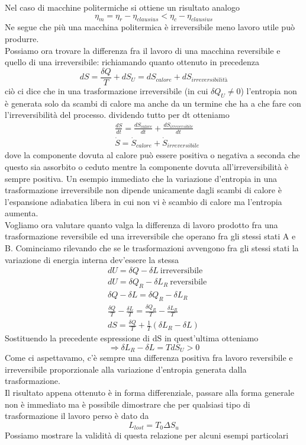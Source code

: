 \documentclass[10pt,a4paper]{article}
\begin{document}
Nel caso di macchine politermiche si ottiene un risultato analogo 
\[\eta_m = \eta_r - \eta_{clausius} < \eta_c -\eta_{clausius}\]
Ne segue che più una macchina politermica è irreversibile meno lavoro utile può produrre.\\
Possiamo ora trovare la differenza fra il lavoro di una macchina reversibile e quello di una irreversibile: richiamando quanto ottenuto in precedenza
\[dS = \frac{\delta Q}{T}+dS_U=dS_{calore} +dS_{irreversibilità}\]
ciò ci dice che in una trasformazione irreversibile (in cui $\delta Q_U \neq 0$) l'entropia non è generata solo da scambi di calore ma anche da un termine che ha a che fare con l'irreversibilità del processo. dividendo tutto per dt otteniamo
\begin{align*}
	&\frac{dS}{dt}=\frac{dS_{calore}}{dt}+\frac{dS_{irreversibile}}{dt}\\
	&\dot{S} = \dot{S}_{calore} + \dot{S}_{irreversibile}
\end{align*}
dove la componente dovuta al calore può essere positiva o negativa a seconda che questo sia assorbito o ceduto mentre la componente dovuta all'irreversibilità è sempre positiva. Un esempio immediato che la variazione d'entropia in una trasformazione irreversibile non dipende unicamente dagli scambi di calore è l'espansione adiabatica libera in cui non vi è scambio di calore ma l'entropia aumenta.\\
Vogliamo ora valutare quanto valga la differenza di lavoro prodotto fra una trasformazione reversibile ed una irreversibile che operano fra gli stessi stati A e B. Cominciamo rilevando che se le trasformazioni avvengono fra gli stessi stati la variazione di energia interna dev'essere la stessa
\begin{align*}
	&dU = \delta Q - \delta L\ \text{irreversibile}\\
	&dU = \delta Q_R - \delta L_R\ \text{reversibile}\\
	&\delta Q - \delta L = \delta Q_R - \delta L_R\\
	&\frac{\delta Q}{T} - \frac{\delta L}{T} = \frac{\delta Q_R}{T} - \frac{\delta L_R}{T}\\
	&dS = \frac{\delta Q}{T}+\frac{1}{T}(\delta L_R-\delta L)
\end{align*}
Sostituendo la precedente espressione di dS in quest'ultima otteniamo
\[\Rightarrow \delta L_R-\delta L = T dS_U>0\]
Come ci aspettavamo, c'è sempre una differenza positiva fra lavoro reversibile e irreversibile proporzionale alla variazione d'entropia generata dalla trasformazione.\\
Il risultato appena ottenuto è in forma  differenziale, passare alla forma generale non è immediato ma è  possibile dimostrare che per qualsiasi tipo di trasformazione il lavoro perso è dato da
\[L_{lost} = T_0 \Delta S_u\]
Possiamo mostrare la validità di questa relazione per alcuni esempi particolari
\end{document}
